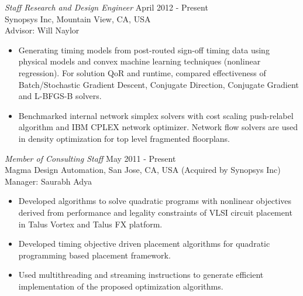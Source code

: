 \documentclass[margin]{res}
\begin{document}
\begin{resume}
\begin{itemize}
\end{itemize}

{\sl Staff Research and Design Engineer} \hfill April 2012 - Present\\
Synopsys Inc, Mountain View, CA, USA\\
Advisor: Will Naylor
\begin{itemize} \itemsep -2pt
\item Generating timing models from post-routed sign-off timing data using
  physical models and convex machine learning techniques 
  (nonlinear regression). For solution QoR and runtime, compared
  effectiveness of Batch/Stochastic Gradient Descent, Conjugate Direction, 
  Conjugate Gradient and L-BFGS-B solvers.
\item Benchmarked internal network simplex solvers with cost scaling
  push-relabel algorithm and IBM CPLEX network optimizer. Network flow 
  solvers are used in density optimization for top level fragmented floorplans.
\end{itemize}

{\sl Member of Consulting Staff} \hfill May 2011 - Present\\
Magma Design Automation, San Jose, CA, USA (Acquired by Synopsys Inc)\\
Manager: Saurabh Adya
\begin{itemize} \itemsep -2pt
\item Developed algorithms to solve quadratic programs with nonlinear
  objectives derived from performance and legality constraints of VLSI circuit
  placement in Talus Vortex and Talus FX platform.
\item Developed timing objective driven placement algorithms for quadratic 
  programming based placement framework.
\item Used multithreading and streaming instructions to generate efficient
  implementation of the proposed optimization algorithms.
\end{itemize}


\end{resume}
\end{document}

